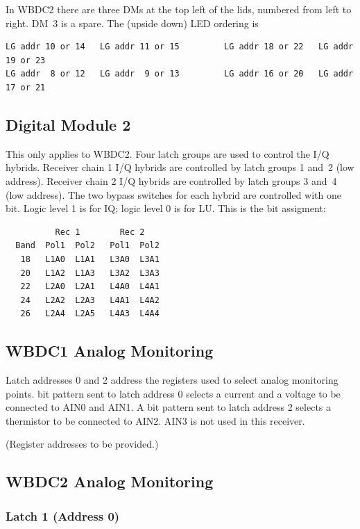 \documentclass[letterpaper,11pt]{book}
\begin{document}
In WBDC2 there are three DMs at the top left of the lids, numbered from left
to right.  DM~3 is a spare. The (upside down) LED ordering is
\begin{verbatim}
LG addr 10 or 14   LG addr 11 or 15         LG addr 18 or 22   LG addr 19 or 23
LG addr  8 or 12   LG addr  9 or 13         LG addr 16 or 20   LG addr 17 or 21
\end{verbatim}

\subsection{Digital Module 2}\label{sec:DM2}

This only applies to WBDC2.  Four latch groups are used to control the I/Q
hybrids.
Receiver chain 1 I/Q hybrids are controlled by latch groups 1 and~2 (low 
address). Receiver chain 2 I/Q hybrids are controlled by latch groups 3 and~4
(low address).
The two bypass switches for each hybrid are controlled with one bit.
Logic level 1 is for IQ; logic level 0 is for LU.
This is the bit assigment:
\begin{verbatim}
          Rec 1        Rec 2
  Band  Pol1  Pol2   Pol1  Pol2
   18   L1A0  L1A1   L3A0  L3A1
   20   L1A2  L1A3   L3A2  L3A3
   22   L2A0  L2A1   L4A0  L4A1
   24   L2A2  L2A3   L4A1  L4A2
   26   L2A4  L2A5   L4A3  L4A4
\end{verbatim}
   
\subsection{WBDC1 Analog Monitoring}

Latch addresses 0 and 2 address the
registers used to select analog monitoring points.
bit pattern sent to latch address 0 selects a current and a voltage
to be connected to AIN0 and AIN1.  A bit pattern sent to latch address
2 selects a thermistor to be connected to AIN2.  AIN3 is not used in this
receiver.

(Register addresses to be provided.)

\subsection{WBDC2 Analog Monitoring}

\subsubsection{Latch 1 (Address 0)}
\end{document}
